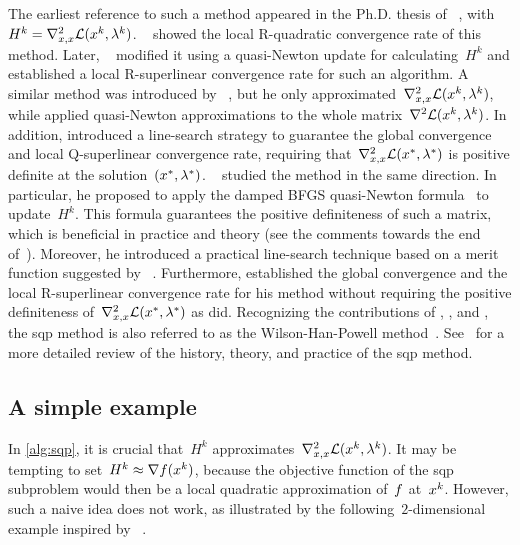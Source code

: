 The earliest reference to such a method appeared in the Ph.D. thesis of \citeauthor{Wilson_1963}~\cite{Wilson_1963}, with~$H^k = \nabla_{x, x}^2 \lag(\iter[k], \lm[k])$.
~\cite{Robinson_1974} showed the local R-quadratic convergence rate of this method.
Later, \citeauthor{Garcia-Palomares_Mangasarian_1976}~\cite{Garcia-Palomares_1973,Garcia-Palomares_Mangasarian_1976} modified it using a quasi-Newton update for calculating~$H^k$ and established a local R-superlinear convergence rate for such an algorithm.
A similar method was introduced by \citeauthor{Han_1976}~\cite{Han_1976,Han_1977}, but he only approximated~$\nabla_{x, x}^2 \lag(\iter[k], \lm[k])$, while \citeauthor{Garcia-Palomares_Mangasarian_1976} applied quasi-Newton approximations to the whole matrix~$\nabla^2 \lag(\iter[k], \lm[k])$.
In addition, \citeauthor{Han_1976} introduced a line-search strategy to guarantee the global convergence and local Q-superlinear convergence rate, requiring that~$\nabla_{x, x}^2 \lag(\iter[\ast], \lm[\ast])$ is positive definite at the solution~$(\iter[\ast], \lm[\ast])$.
~\cite{Powell_1978b,Powell_1978a,Powell_1978c} studied the method in the same direction.
In particular, he proposed to apply the damped BFGS quasi-Newton formula~\cite[Eqs.~(5.8),~(5.9), and~(5.10)]{Powell_1978b} to update~$H^k$.
This formula guarantees the positive definiteness of such a matrix, which is beneficial in practice and theory (see the comments towards the end of~\cite[\S~2]{Powell_1978a}).
Moreover, he introduced a practical line-search technique based on a merit function suggested by \citeauthor{Han_1976}~\cite{Han_1976}.
Furthermore, \citeauthor{Powell_1978c} established the global convergence and the local R-superlinear convergence rate for his method without requiring the positive definiteness of~$\nabla_{x, x}^2 \lag(\iter[\ast], \lm[\ast])$ as \citeauthor{Han_1976} did.
Recognizing the contributions of \citeauthor{Wilson_1963}, , and \citeauthor{Powell_1978a}, the \gls{sqp} method is also referred to as the Wilson-Han-Powell method~\cite{Schittkowski_1981,Burke_1992}.
See~\cite{Boggs_Tolle_1995} for a more detailed review of the history, theory, and practice of the \gls{sqp} method.

\subsection{A simple example}
\label{subsec:sqp-simple-example}

In \cref{alg:sqp}, it is crucial that~$H^k$ approximates~$\nabla_{x, x}^2 \lag(\iter[k], \lm[k])$.
It may be tempting to set~$H^k \approx \nabla \obj(\iter[k])$, because the objective function of the \gls{sqp} subproblem would then be a local quadratic approximation of~$f$ at~$\iter[k]$.
However, such a naive idea does not work, as illustrated by the following~$2$-dimensional example inspired by \citeauthor{Boggs_Tolle_1995}~\cite[\S~2.2]{Boggs_Tolle_1995}.

